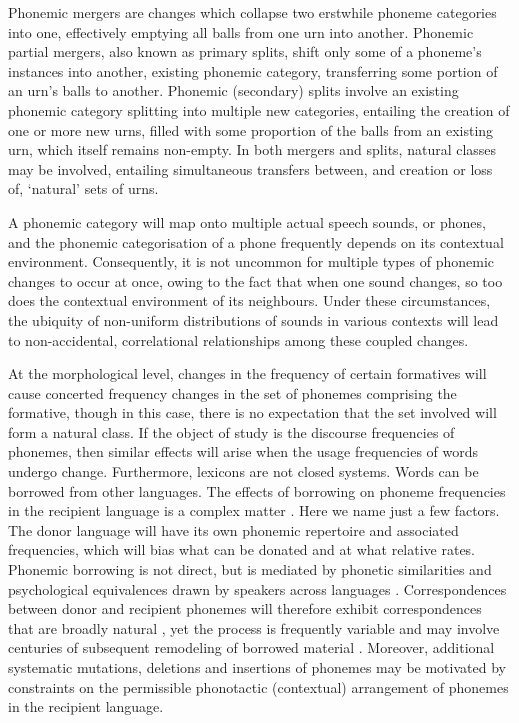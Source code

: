 Phonemic mergers \autocite{hoenigswald1965language} are changes which collapse two erstwhile phoneme categories into one, effectively emptying all balls from one urn into another. Phonemic partial mergers, also known as primary splits, shift only some of a phoneme's instances into another, existing phonemic category, transferring some portion of an urn's balls to another. Phonemic (secondary) splits involve an existing phonemic category splitting into multiple new categories, entailing the creation of one or more new urns, filled with some proportion of the balls from an existing urn, which itself remains non-empty. In both mergers and splits, natural classes may be involved, entailing simultaneous transfers between, and creation or loss of, `natural' sets of urns.

A phonemic category will map onto multiple actual speech sounds, or phones, and the phonemic categorisation of a phone frequently depends on its contextual environment. Consequently, it is not uncommon for multiple types of phonemic changes to occur at once, owing to the fact that when one sound changes, so too does the contextual environment of its neighbours. Under these circumstances, the ubiquity of non-uniform distributions of sounds in various contexts will lead to non-accidental, correlational relationships among these coupled changes.

At the morphological level, changes in the frequency of certain formatives will cause concerted frequency changes in the set of phonemes comprising the formative, though in this case, there is no expectation that the set involved will form a natural class. If the object of study is the discourse frequencies of phonemes, then similar effects will arise when the usage frequencies of words undergo change. Furthermore, lexicons are not closed systems. Words can be borrowed from other languages. The effects of borrowing on phoneme frequencies in the recipient language is a complex matter \autocite{boretzky1991contact}. Here we name just a few factors. The donor language will have its own phonemic repertoire and associated frequencies, which will bias what can be donated and at what relative rates. Phonemic borrowing is not direct, but is mediated by phonetic similarities and psychological equivalences drawn by speakers across languages \autocites{flege1987production}{kang2003perceptual}. Correspondences between donor and recipient phonemes will therefore exhibit correspondences that are broadly natural \autocite{paradis1997preservation}, yet the process is frequently variable \autocite{lev2014effect} and may involve centuries of subsequent remodeling of borrowed material \autocite{crawford_adaptation_2009}. Moreover, additional systematic mutations, deletions and insertions of phonemes may be motivated by constraints on the permissible phonotactic (contextual) arrangement of phonemes in the recipient language.

